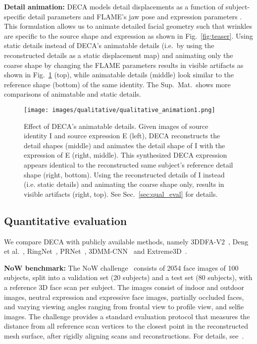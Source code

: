 \documentclass[final]{cvpr}
\newcommand{\qheading}[1]{\noindent\textbf{#1}}
\newcommand{\modelname}{DECA\xspace}
\newcommand{\supmat}{Sup.~Mat.\xspace}
\begin{document}
\qheading{Detail animation:}
\modelname models detail displacements as a function of subject-specific detail parameters  and FLAME's jaw pose  and expression parameters .
This formulation allows us to animate detailed facial geometry such that wrinkles are specific to the source shape and expression as shown in Fig.~\ref{fig:teaser}.
Using static details instead of \modelname's animatable details (i.e.~by using the reconstructed details as a static displacement map) and animating only the coarse shape by changing the FLAME parameters results in visible artifacts as shown in Fig.~\ref{fig:animation2} (top), while animatable details (middle) look similar to the reference shape (bottom) of the same identity. 
The \supmat~shows more comparisons of animatable and static details. 

\begin{figure}[t]
	\centering
	\texttt{[image: images/qualitative/qualitative\_animation1.png]}  
	\caption{Effect of \modelname's animatable details. Given images of source identity I and source expression E (left), \modelname reconstructs the detail shapes (middle) and animates the detail shape of I with the expression of E (right, middle). This synthesized \modelname expression appears identical to the reconstructed same subject's reference detail shape (right, bottom). Using the reconstructed details of I instead (i.e. static details) and animating the coarse shape only, results in visible artifacts (right, top). See Sec.~\ref{sec:qual_eval} for details.}
	\label{fig:animation2}
\end{figure}

\subsection{Quantitative evaluation}
We compare \modelname with publicly available methods, namely 3DDFA-V2~\cite{guo2020towards}, Deng et al.~\cite{Deng2019}, RingNet~\cite{Sanyal2019}, PRNet~\cite{Feng2018}, 3DMM-CNN~\cite{AnhTran2017} and Extreme3D~\cite{AnhTran2018}.

\qheading{NoW benchmark:} 
The NoW challenge~\cite{Sanyal2019} consists of 2054 face images of 100 subjects, split into a validation set (20 subjects) and a test set (80 subjects), with a reference 3D face scan per subject. 
The images consist of indoor and outdoor images, neutral expression and expressive face images, partially occluded faces, and varying viewing angles ranging from frontal view to profile view, and selfie images.
The challenge provides a standard evaluation protocol that measures the distance from all reference scan vertices to the closest point in the reconstructed mesh surface, after rigidly aligning scans and reconstructions. 
For details, see~\cite{NoW2019}.
\end{document}
